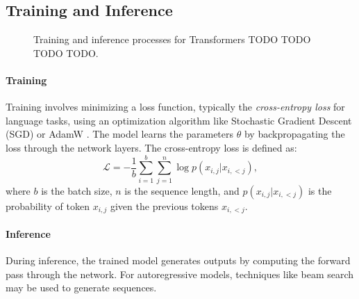 \subsection{Training and Inference}\label{subsec:training_inference}



\begin{figure}[h!]
    \centering


    \caption{Training and inference processes for Transformers TODO TODO TODO TODO.}
    \label{fig:transformer_training_inference}
\end{figure}

\paragraph{Training}

Training involves minimizing a loss function, typically the \emph{cross-entropy loss} for language tasks, using an optimization algorithm like Stochastic Gradient Descent (SGD) or AdamW \parencite{loshchilov_decoupled_2018}. The model learns the parameters $\theta$ by backpropagating the loss through the network layers. The cross-entropy loss is defined as:
\begin{equation*}
    \mathcal{L} = -\frac{1}{b} \sum_{i=1}^{b} \sum_{j=1}^{n} \log p(x_{i,j} | x_{i,<j}),
\end{equation*}
where $b$ is the batch size, $n$ is the sequence length, and $p(x_{i,j} | x_{i,<j})$ is the probability of token $x_{i,j}$ given the previous tokens $x_{i,<j}$.


\paragraph{Inference}

During inference, the trained model generates outputs by computing the forward pass through the network. For autoregressive models, techniques like beam search may be used to generate sequences.



